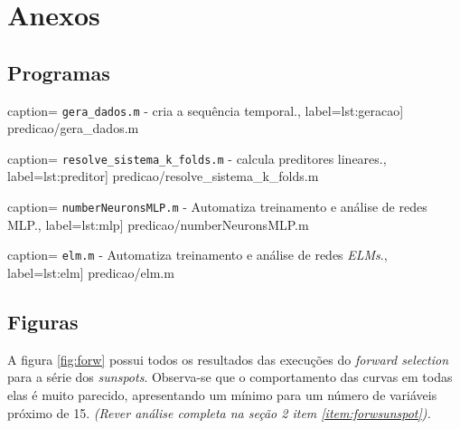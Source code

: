\newpage

\section{Anexos}

\subsection {Programas}

 caption={ \texttt{gera\_dados.m} - cria a
		sequência temporal.}, label={lst:geracao}] {predicao/gera_dados.m}
		
 caption={
\texttt{resolve\_sistema\_k\_folds.m} - calcula preditores lineares.},
label={lst:preditor}] {predicao/resolve_sistema_k_folds.m}

 caption={ 
\texttt{numberNeuronsMLP.m} - Automatiza treinamento e análise de redes MLP.},
label={lst:mlp}] {predicao/numberNeuronsMLP.m}

 caption={ 
\texttt{elm.m} - Automatiza treinamento e análise de redes \textit{ELMs}.},
label={lst:elm}] {predicao/elm.m}
		
\FloatBarrier

\newpage

\subsection {Figuras}

A figura \ref{fig:forw} possui todos os resultados das execuções do
\textit{forward selection} para a série dos \textit{sunspots}. Observa-se que o
comportamento das curvas em todas elas é muito parecido, apresentando um mínimo para um número de variáveis
próximo de 15. \textit{(Rever análise completa na seção 2 item
\ref{item:forwsunspot}).}

